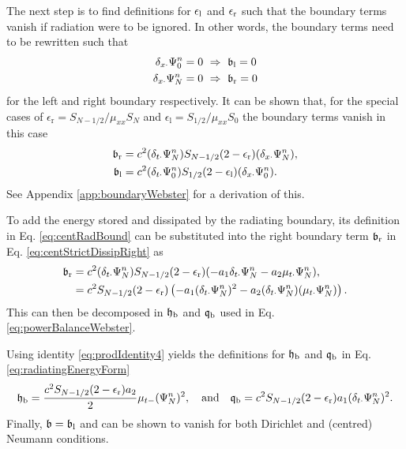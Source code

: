 {The next step is to find definitions for $\epsilon_\text{l}$ and $\epsilon_\text{r}$ such that the boundary terms vanish if radiation were to be ignored. In other words, the boundary terms need to be rewritten such that 
\begin{align*}
    \delta_{x\cdot} \Psi_0^n &= 0\  \Rightarrow\ \mathfrak{b}_\text{l} = 0 \\
    \delta_{x\cdot} \Psi_N^n &= 0\  \Rightarrow\ \mathfrak{b}_\text{r} = 0
\end{align*} 
for the left and right boundary respectively. It can be shown that, for the special cases of $\epsilon_\text{r} = S_{N-1/2}/\mu_{xx}S_N$ and $\epsilon_\text{l} = S_{1/2}/\mu_{xx}S_0$ the boundary terms vanish in this case
\begin{subequations}\label{eq:centStrictDissip}
\begin{align}
    \mathfrak{b}_\text{r} &= c^2 (\delta_{t\cdot}\Psi_N^n)S_{N-1/2}(2-\epsilon_\text{r})(\delta_{x\cdot}\Psi_N^n)\label{eq:centStrictDissipRight},\\
    \mathfrak{b}_\text{l} &= c^2 (\delta_{t\cdot}\Psi_0^n)S_{1/2}(2-\epsilon_\text{l})(\delta_{x\cdot}\Psi_0^n).\label{eq:centStrictDissipLeft}
\end{align}
\end{subequations}
See Appendix \ref{app:boundaryWebster} for a derivation of this. %

To add the energy stored and dissipated by the radiating boundary, its definition in Eq. \eqref{eq:centRadBound} can be substituted into the right boundary term $\mathfrak{b}_\text{r}$ in Eq. \eqref{eq:centStrictDissipRight} as 
\begin{align*}
    \mathfrak{b}_\text{r} &= c^2 (\delta_{t\cdot}\Psi_N^n)S_{N-1/2}(2-\epsilon_\text{r})(-a_1\delta_{t\cdot}\Psi_N^n - a_2\mu_{t\cdot}\Psi_N^n),\\
    &= c^2 S_{N-1/2}(2-\epsilon_\text{r})\left(-a_1(\delta_{t\cdot}\Psi_N^n)^2 - a_2(\delta_{t\cdot}\Psi_N^n)(\mu_{t\cdot}\Psi_N^n)\right).
\end{align*}
This can then be decomposed in $\mathfrak{h}_\text{b}$ and $\mathfrak{q}_\text{b}$ used in Eq. \eqref{eq:powerBalanceWebster}. 

Using identity \eqref{eq:prodIdentity4} yields the definitions for $\mathfrak{h}_\text{b}$ and $\mathfrak{q}_\text{b}$ in Eq. \eqref{eq:radiatingEnergyForm}
\begin{equation}
    \mathfrak{h}_\text{b} = \frac{c^2 S_{N-1/2}(2-\epsilon_\text{r}) a_2}{2} \mu_{t-}(\Psi_N^n)^2, \quad \text{and} \quad \mathfrak{q}_\text{b} = c^2 S_{N-1/2}(2-\epsilon_\text{r})a_1(\delta_{t\cdot}\Psi_N^n)^2.
\end{equation}
Finally, $\mathfrak{b} = \mathfrak{b}_\text{l}$ and can be shown to vanish for both Dirichlet and (centred) Neumann conditions.

}
